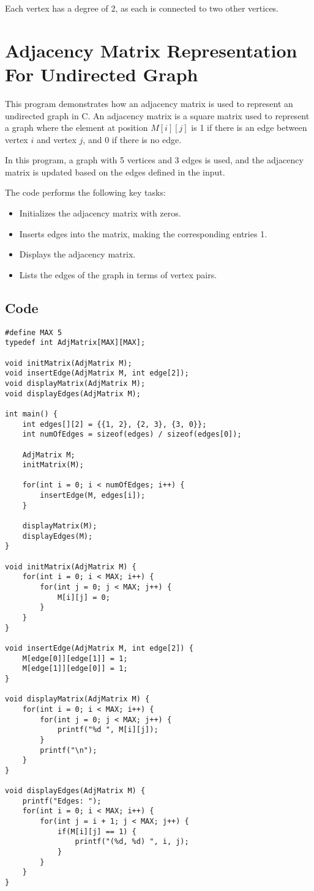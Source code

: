 \documentclass{book}
\begin{document}
Each vertex has a degree of 2, as each is connected to two other vertices.

\section{Adjacency Matrix Representation For Undirected Graph}
This program demonstrates how an adjacency matrix is used to represent an undirected graph in C. An adjacency matrix is a square matrix used to represent a graph where the element at position \( M[i][j] \) is 1 if there is an edge between vertex \( i \) and vertex \( j \), and 0 if there is no edge. 

In this program, a graph with 5 vertices and 3 edges is used, and the adjacency matrix is updated based on the edges defined in the input.

The code performs the following key tasks:
\begin{itemize}
    \item Initializes the adjacency matrix with zeros.
    \item Inserts edges into the matrix, making the corresponding entries 1.
    \item Displays the adjacency matrix.
    \item Lists the edges of the graph in terms of vertex pairs.
\end{itemize}

\subsection{Code}

\begin{verbatim}
#define MAX 5
typedef int AdjMatrix[MAX][MAX];

void initMatrix(AdjMatrix M);
void insertEdge(AdjMatrix M, int edge[2]);
void displayMatrix(AdjMatrix M);
void displayEdges(AdjMatrix M);

int main() {
    int edges[][2] = {{1, 2}, {2, 3}, {3, 0}};
    int numOfEdges = sizeof(edges) / sizeof(edges[0]);
    
    AdjMatrix M;
    initMatrix(M);

    for(int i = 0; i < numOfEdges; i++) {
        insertEdge(M, edges[i]);
    }

    displayMatrix(M);
    displayEdges(M);
}

void initMatrix(AdjMatrix M) {
    for(int i = 0; i < MAX; i++) {
        for(int j = 0; j < MAX; j++) {
            M[i][j] = 0;
        }
    }
}

void insertEdge(AdjMatrix M, int edge[2]) {
    M[edge[0]][edge[1]] = 1;
    M[edge[1]][edge[0]] = 1;
}

void displayMatrix(AdjMatrix M) {
    for(int i = 0; i < MAX; i++) {
        for(int j = 0; j < MAX; j++) {
            printf("%d ", M[i][j]);
        }
        printf("\n");
    }
}

void displayEdges(AdjMatrix M) {
    printf("Edges: ");
    for(int i = 0; i < MAX; i++) {
        for(int j = i + 1; j < MAX; j++) {
            if(M[i][j] == 1) {
                printf("(%d, %d) ", i, j);
            }
        }
    }
}
\end{verbatim}
\end{document}
